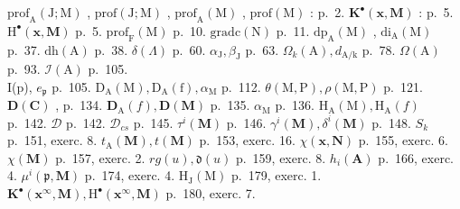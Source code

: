 
\(\mathrm{prof}_{\mathrm{A}}(\mathrm{J};\mathrm{M})\) , \(\mathrm{prof}(\mathrm{J};\mathrm{M})\) , \(\mathrm{prof}_{\mathrm{A}}(\mathrm{M})\) , \(\mathrm{prof}(\mathrm{M})\) : p.~2. \(\mathbf{K}^{\bullet}(\mathbf{x},\mathbf{M})\) : p.~5. \(\mathrm{H}^{\bullet}(\mathbf{x},\mathbf{M})\) p.~5. \(\mathrm{prof}_{\mathrm{F}}(\mathrm{M})\) p.~10. \(\mathrm{gradc}(\mathrm{N})\) p.~11. \(\mathrm{dp}_{\mathrm{A}}(\mathrm{M})\) , \(\mathrm{di}_{\mathrm{A}}(\mathrm{M})\) p.~37. \(\mathrm{dh(A)}\) p.~38. \(\delta (\Lambda)\) p.~60. \(\alpha_{\mathrm{J}},\beta_{\mathrm{J}}\) p.~63. \(\Omega_k(\mathrm{A}),d_{\mathrm{A / k}}\) p.~78. \(\Omega (\mathrm{A})\) p.~93. \(\mathcal{I}(\mathrm{A})\) p.~105.\\
I(p), \(e_{\mathfrak{p}}\) p.~105. \(\mathrm{D_A(M),D_A(f),}\alpha_{\mathrm{M}}\) p.~112. \(\theta (\mathrm{M},\mathrm{P}),\rho (\mathrm{M},\mathrm{P})\) p.~121. \(\mathbf{D}(\mathbf{C})\) , p.~134. \(\mathbf{D}_{\mathrm{A}}(f),\mathbf{D}(\mathbf{M})\) p.~135. \(\alpha_{\mathrm{M}}\) p.~136. \(\mathrm{H}_{\mathrm{A}}(\mathrm{M}),\mathrm{H}_{\mathrm{A}}(f)\) p.~142. \(\mathcal{D}\) p.~142. \(\mathcal{D}_{cs}\) p.~145. \(\tau^i (\mathbf{M})\) p.~146. \(\gamma^i (\mathbf{M}),\delta^i (\mathbf{M})\) p.~148. \(S_{k}\) p.~151, exerc. 8. \(t_\mathrm{A}(\mathbf{M}),t(\mathbf{M})\) p.~153, exerc. 16. \(\chi (\mathbf{x},\mathbf{N})\) p.~155, exerc. 6. \(\chi (\mathbf{M})\) p.~157, exerc. 2. \(rg(u),\mathfrak{d}(u)\) p.~159, exerc. 8. \(h_i(\mathbf{A})\) p.~166, exerc. 4. \(\mu^i (\mathfrak{p},\mathbf{M})\) p.~174, exerc. 4. \(\mathrm{H}_{\mathrm{J}}(\mathrm{M})\) p.~179, exerc. 1. \(\mathbf{K}^{\bullet}(\mathbf{x}^{\infty},\mathbf{M}),\mathrm{H}^{\bullet}(\mathbf{x}^{\infty},\mathbf{M})\) p.~180, exerc. 7.

